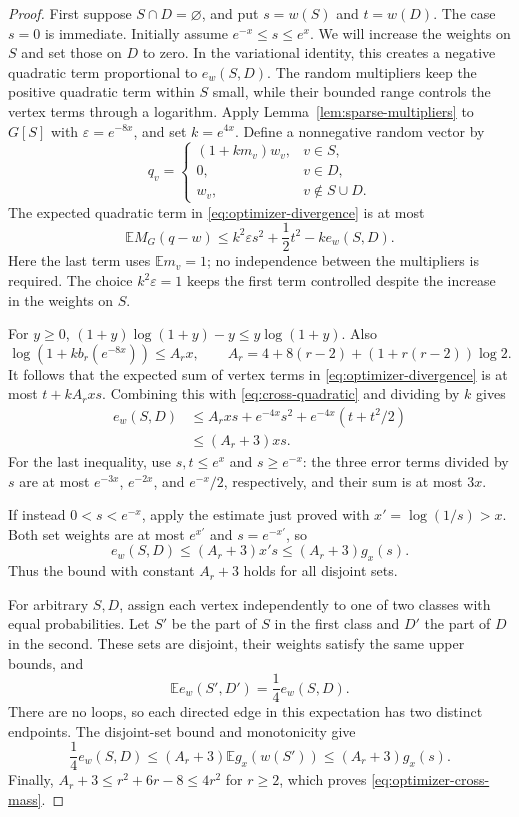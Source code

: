 \documentclass[11pt]{article}
\theoremstyle{definition}
\theoremstyle{remark}
\numberwithin{equation}{section}
\begin{document}
\begin{proof}
First suppose $S\cap D=\varnothing$, and put $s=w(S)$ and $t=w(D)$.
The case $s=0$ is immediate.  Initially assume $e^{-x}\le s\le e^x$.
We will increase the weights on $S$ and set those on $D$ to zero.
In the variational identity, this creates a negative quadratic term
proportional to $e_w(S,D)$. The random multipliers keep the positive
quadratic term within $S$ small, while their bounded range controls the
vertex terms through a logarithm.
Apply Lemma~\ref{lem:sparse-multipliers} to $G[S]$ with
$\varepsilon=e^{-8x}$, and set $k=e^{4x}$.  Define a nonnegative random
vector by
\[
 q_v=
 \begin{cases}
 (1+km_v)w_v,&v\in S,\\
 0,&v\in D,\\
 w_v,&v\notin S\cup D.
 \end{cases}
\]
The expected quadratic term in \eqref{eq:optimizer-divergence} is at most
\begin{equation}\label{eq:cross-quadratic}
 \mathbb E M_G(q-w)
 \le k^2\varepsilon s^2+\frac12t^2-k e_w(S,D).
\end{equation}
Here the last term uses $\mathbb E m_v=1$; no independence between the
multipliers is required. The choice $k^2\varepsilon=1$ keeps the first
term controlled despite the increase in the weights on $S$.

For $y\ge0$,
$(1+y)\log(1+y)-y\le y\log(1+y)$.  Also
\[
 \log(1+kb_r(e^{-8x}))\le A_rx,
 \qquad
 A_r=4+8(r-2)+(1+r(r-2))\log2.
\]
It follows that the expected sum of vertex terms in
\eqref{eq:optimizer-divergence} is at most $t+kA_rxs$.
Combining this with \eqref{eq:cross-quadratic} and dividing by $k$ gives
\begin{align*}
 e_w(S,D)
 &\le A_rxs+e^{-4x}s^2+e^{-4x}(t+t^2/2)\\
 &\le (A_r+3)xs.
\end{align*}
For the last inequality, use $s,t\le e^x$ and $s\ge e^{-x}$: the three
error terms divided by $s$ are at most $e^{-3x}$, $e^{-2x}$, and
$e^{-x}/2$, respectively, and their sum is at most $3x$.

If instead $0<s<e^{-x}$, apply the estimate just proved with
$x'=\log(1/s)>x$.  Both set weights are at most $e^{x'}$ and
$s=e^{-x'}$, so
\[
 e_w(S,D)\le(A_r+3)x's\le(A_r+3)g_x(s).
\]
Thus the bound with constant $A_r+3$ holds for all disjoint sets.

For arbitrary $S,D$, assign each vertex independently to one of two
classes with equal probabilities.  Let $S'$ be the part of $S$ in the
first class and $D'$ the part of $D$ in the second.  These sets are
disjoint, their weights satisfy the same upper bounds, and
\[
 \mathbb E e_w(S',D')=\frac14e_w(S,D).
\]
There are no loops, so each directed edge in this expectation has two
distinct endpoints.  The disjoint-set bound and monotonicity give
\[
 \frac14e_w(S,D)
 \le (A_r+3)\mathbb E g_x(w(S'))
 \le (A_r+3)g_x(s).
\]
Finally, $A_r+3\le r^2+6r-8\le4r^2$ for $r\ge2$, which proves
\eqref{eq:optimizer-cross-mass}.
\end{proof}
\end{document}
